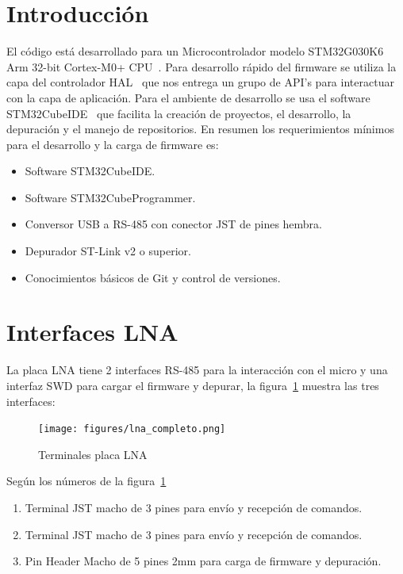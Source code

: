 \documentclass[12pt,twoside,onecolumn]{article}
\begin{document}



\newpage
\tableofcontents


\newpage
\section{Introducción}
El código está desarrollado para un Microcontrolador modelo STM32G030K6 Arm 32-bit Cortex-M0+ CPU~\cite{web:STM32G030K6}. Para desarrollo rápido del firmware se utiliza la capa del controlador HAL~\cite{web:hal-library} que nos entrega un grupo de API's para interactuar con la capa de aplicación. Para el ambiente de desarrollo se usa el software STM32CubeIDE~\cite{web:stm32cubeide} que facilita la creación de proyectos, el desarrollo, la depuración y el manejo de repositorios. En resumen los requerimientos mínimos para el desarrollo y la carga de firmware es:

\begin{itemize}
\setlength\itemsep{-0.1em}
    \item Software STM32CubeIDE. 
    \item Software STM32CubeProgrammer. 
    \item Conversor USB a RS-485 con conector JST de pines hembra.
    \item Depurador ST-Link v2 o superior.
    \item Conocimientos básicos de Git y control de versiones.
\end{itemize}

\section{Interfaces LNA}
La placa LNA tiene 2 interfaces RS-485 para la interacción con el micro y una interfaz SWD para cargar el firmware y depurar, la figura~\ref{fig:lna_completo} muestra las tres interfaces:
\begin{figure}[H]
  \centering
   \texttt{[image: figures/lna\_completo.png]}
  \caption{Terminales placa LNA}
  \label{fig:lna_completo}
\end{figure}
Según los números de la figura~\ref{fig:lna_completo}
\begin{enumerate}
\setlength\itemsep{-0.1em}
    \item Terminal JST macho de 3 pines para envío y recepción de comandos.
    \item Terminal JST macho de 3 pines para envío y recepción de comandos.
    \item Pin Header Macho de 5 pines 2mm para carga de firmware y depuración.
\end{enumerate}
\end{document}
